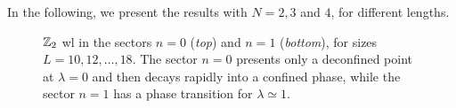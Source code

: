 
In the following, we present the results with $N=2,3$ and $4$, for different lengths.


\begin{figure}[t]
    \centering
    
    \vspace*{-10pt}
    \caption[\ac{wl}s for the $\Z_2$ ladder \ac{lgt}]{$\Z_2$ \ac{wl} in the sectors $n=0$ (\emph{top}) and $n=1$ (\emph{bottom}), for sizes $L=10,12, \dots,18$.
    The sector $n=0$ presents only a deconfined point at $\lambda=0$ and then decays rapidly into a confined phase, while the sector $n=1$ has a phase transition for $\lambda \simeq 1$.
    }
    \label{fig:z2_wilson}
\end{figure}

\smallskip

%     



